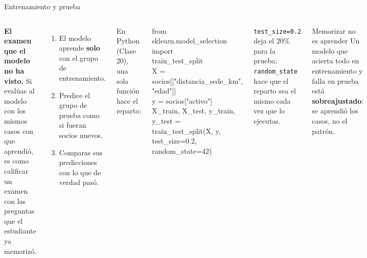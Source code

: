 \documentclass[aspectratio=169,11pt]{beamer}
\newcommand{\codigo}[1]{\par\smallskip\noindent\colorbox{esumerGray!70}{\parbox{\dimexpr\linewidth-2\fboxsep\relax}{\scriptsize\ttfamily #1}}\par\smallskip}
\begin{document}
\begin{frame}[t]{Entrenamiento y prueba}
  \begin{columns}[T,onlytextwidth]
    \small
    \textbf{El examen que el modelo no ha visto.} Si evalúas al modelo con
    los mismos casos con que aprendió, es como
    calificar un examen con las preguntas que el estudiante ya memorizó.
    \vspace{0.15cm}

    \vspace{0.1cm}

    \footnotesize
    \begin{enumerate}
      \footnotesize
      \item El modelo aprende \textbf{solo} con el grupo de entrenamiento.
      \item Predice el grupo de prueba como si fueran socios nuevos.
      \item Comparas sus predicciones con lo que de verdad pasó.
    \end{enumerate}
    \footnotesize En Python (Clase 20), una sola función hace el reparto:
    \codigo{from sklearn.model\_selection import \\
      \hspace*{1em}train\_test\_split\\[3pt]
      X = socios[["distancia\_sede\_km", "edad"]]\\
      y = socios["activo"]\\[3pt]
      X\_train, X\_test, y\_train, y\_test = \\
      \hspace*{1em}train\_test\_split(X, y,\\
      \hspace*{2em}test\_size=0.2, random\_state=42)}
    \scriptsize\raggedright \texttt{test\_size=0.2} deja el 20\% para la prueba;
    \texttt{random\_state} hace que el reparto sea el mismo cada vez que lo
    ejecutas.
    \begin{alertblock}{Memorizar no es aprender}
      \scriptsize Un modelo que acierta todo en entrenamiento y falla en
      prueba está \textbf{sobreajustado}: se aprendió los casos, no el
      patrón.
    \end{alertblock}
  \end{columns}
\end{frame}
\end{document}
